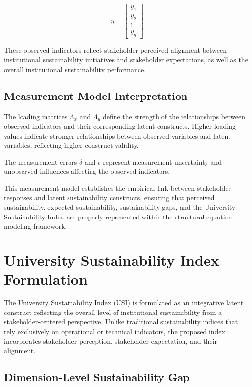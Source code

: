 \documentclass[11pt,a4paper]{article}
\begin{document}
\begin{equation}
y =
\begin{bmatrix}
y_1 \\
y_2 \\
\vdots \\
y_q
\end{bmatrix}
\end{equation}

These observed indicators reflect stakeholder-perceived alignment between institutional sustainability initiatives and stakeholder expectations, as well as the overall institutional sustainability performance.

\subsection{Measurement Model Interpretation}

The loading matrices $\Lambda_x$ and $\Lambda_y$ define the strength of the relationships between observed indicators and their corresponding latent constructs. Higher loading values indicate stronger relationships between observed variables and latent variables, reflecting higher construct validity.

The measurement errors $\delta$ and $\epsilon$ represent measurement uncertainty and unobserved influences affecting the observed indicators.

This measurement model establishes the empirical link between stakeholder responses and latent sustainability constructs, ensuring that perceived sustainability, expected sustainability, sustainability gaps, and the University Sustainability Index are properly represented within the structural equation modeling framework.


\section{University Sustainability Index Formulation}

The University Sustainability Index (USI) is formulated as an integrative latent construct reflecting the overall level of institutional sustainability from a stakeholder-centered perspective. Unlike traditional sustainability indices that rely exclusively on operational or technical indicators, the proposed index incorporates stakeholder perception, stakeholder expectation, and their alignment.

\subsection{Dimension-Level Sustainability Gap}
\end{document}
